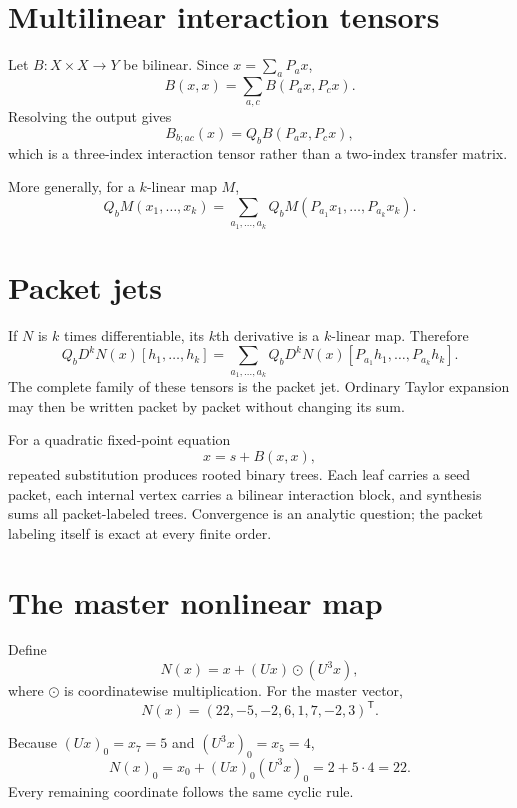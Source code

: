 \section{Multilinear interaction tensors}
Let $B:X\times X\to Y$ be bilinear.  Since $x=\sum_aP_ax$,
\[
\boxed{
B(x,x)
=
\sum_{a,c}B(P_ax,P_cx).
}
\]
Resolving the output gives
\[
B_{b;ac}(x)
=
Q_bB(P_ax,P_cx),
\]
which is a three-index interaction tensor rather than a two-index transfer matrix.

More generally, for a $k$-linear map $M$,
\[
Q_bM(x_1,\ldots,x_k)
=
\sum_{a_1,\ldots,a_k}
Q_bM(P_{a_1}x_1,\ldots,P_{a_k}x_k).
\]


\section{Packet jets}
If $N$ is $k$ times differentiable, its $k$th derivative is a $k$-linear map.  Therefore
\[
\boxed{
Q_bD^kN(x)[h_1,\ldots,h_k]
=
\sum_{a_1,\ldots,a_k}
Q_bD^kN(x)[P_{a_1}h_1,\ldots,P_{a_k}h_k].
}
\]
The complete family of these tensors is the packet jet.  Ordinary Taylor expansion may then be written packet by packet without changing its sum.

For a quadratic fixed-point equation
\[
x=s+B(x,x),
\]
repeated substitution produces rooted binary trees.  Each leaf carries a seed packet, each internal vertex carries a bilinear interaction block, and synthesis sums all packet-labeled trees.  Convergence is an analytic question; the packet labeling itself is exact at every finite order.

\section{The master nonlinear map}
Define
\[
N(x)=x+(Ux)\odot(U^3x),
\]
where $\odot$ is coordinatewise multiplication.  For the master vector,
\[
\boxed{
N(x)=(22,-5,-2,6,1,7,-2,3)^{\mathsf T}.
}
\]

\begin{calculationbox}
Because $(Ux)_0=x_7=5$ and $(U^3x)_0=x_5=4$,
\[
N(x)_0=x_0+(Ux)_0(U^3x)_0=2+5\cdot4=22.
\]
Every remaining coordinate follows the same cyclic rule.
\end{calculationbox}

